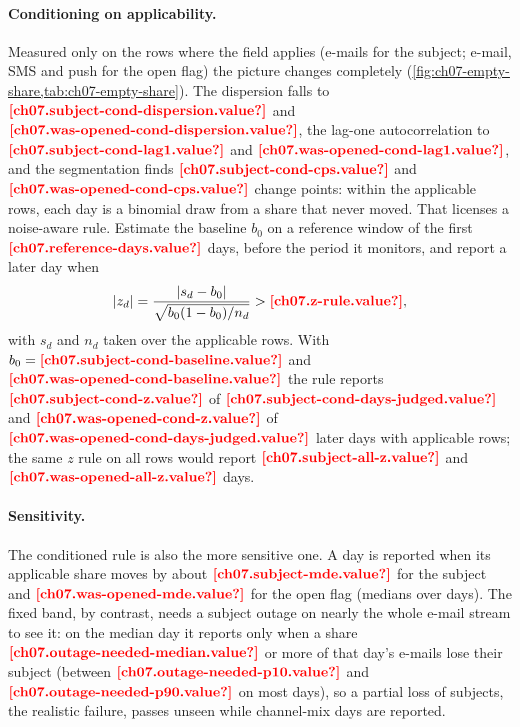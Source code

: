 \paragraph{Conditioning on applicability.} Measured only on the rows where the field applies (e-mails for the subject;
e-mail, SMS and push for the open flag) the picture changes completely (\cref{fig:ch07-empty-share,tab:ch07-empty-share}).
The dispersion falls to $\est{ch07.subject-cond-dispersion}{value}$ and $\est{ch07.was-opened-cond-dispersion}{value}$,
the lag-one autocorrelation to $\est{ch07.subject-cond-lag1}{value}$ and $\est{ch07.was-opened-cond-lag1}{value}$, and
the segmentation finds $\est{ch07.subject-cond-cps}{value}$ and $\est{ch07.was-opened-cond-cps}{value}$ change points:
within the applicable rows, each day is a binomial draw from a share that never moved. That licenses a noise-aware rule.
Estimate the baseline $b_0$ on a reference window of the first $\est{ch07.reference-days}{value}$ days, before the
period it monitors, and report a later day when
\begin{equation}\label{eq:sf-z}
  \lvert z_d \rvert = \frac{\lvert s_d - b_0 \rvert}{\sqrt{b_0 (1 - b_0) / n_d}} > \est{ch07.z-rule}{value},
\end{equation}
with $s_d$ and $n_d$ taken over the applicable rows. With $b_0 = \est{ch07.subject-cond-baseline}{value}$ and
$\est{ch07.was-opened-cond-baseline}{value}$ the rule reports $\est{ch07.subject-cond-z}{value}$ of
$\est{ch07.subject-cond-days-judged}{value}$ and $\est{ch07.was-opened-cond-z}{value}$ of
$\est{ch07.was-opened-cond-days-judged}{value}$ later days with applicable rows; the same $z$ rule on all rows would report
$\est{ch07.subject-all-z}{value}$ and $\est{ch07.was-opened-all-z}{value}$ days.

\paragraph{Sensitivity.} The conditioned rule is also the more sensitive one. A day is reported when its applicable
share moves by about $\est{ch07.subject-mde}{value}$ for the subject and $\est{ch07.was-opened-mde}{value}$ for the open
flag (medians over days). The fixed band, by contrast, needs a subject outage on nearly the whole e-mail stream to see
it: on the median day it reports only when a share $\est{ch07.outage-needed-median}{value}$ or more of that day's
e-mails lose their subject (between $\est{ch07.outage-needed-p10}{value}$ and $\est{ch07.outage-needed-p90}{value}$ on
most days), so a partial loss of subjects, the realistic failure, passes unseen while channel-mix days are reported.

